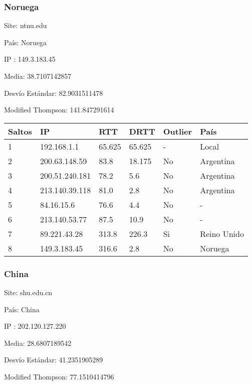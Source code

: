 \subsubsection{Noruega}

Site: ntnu.edu

País: Noruega

IP : 149.3.183.45

Media: 38.7107142857 

Desvío Estándar: 82.9031511478 

Modified Thompson: 141.847291614

\begin{center}
    \begin{tabular}{| l | l | l | l | l | l | }
    \hline
    Saltos & IP             & RTT    & DRTT   & Outlier & País        \\ \hline
    1      & 192.168.1.1    & 65.625 & 65.625 & -       & Local       \\ \hline
    2      & 200.63.148.59  & 83.8   & 18.175 & No      & Argentina   \\ \hline
    3      & 200.51.240.181 & 78.2   & 5.6    & No      & Argentina   \\ \hline
    4      & 213.140.39.118 & 81.0   & 2.8    & No      & Argentina   \\ \hline
    5      & 84.16.15.6     & 76.6   & 4.4    & No      & -           \\ \hline
    6      & 213.140.53.77  & 87.5   & 10.9   & No      & -           \\ \hline
    7      & 89.221.43.28   & 313.8  & 226.3  & Si      & Reino Unido \\ \hline
    8      & 149.3.183.45   & 316.6  & 2.8    & No      & Noruega     \\ \hline
    \end{tabular}
\end{center}

\subsubsection{China}

Site: shu.edu.cn

País: China

IP : 202.120.127.220

Media: 28.6807189542 

Desvío Estándar: 41.2351905289 

Modified Thompson: 77.1510414796

